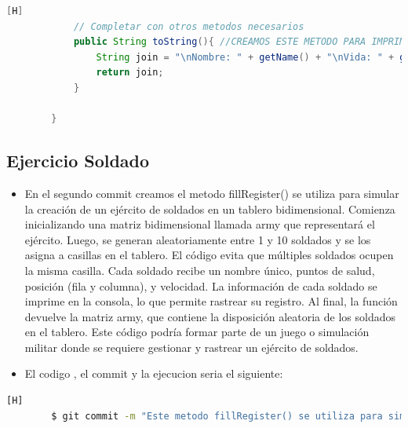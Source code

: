 \documentclass{article}
\begin{document}
\begin{lstlisting}[language=java,caption={Las lineas de codigos del metodo creado:}][H]
			// Completar con otros metodos necesarios
			public String toString(){ //CREAMOS ESTE METODO PARA IMPRIMIR LOS DATOS DEl OBJETO
				String join = "\nNombre: " + getName() + "\nVida: " + getLifeActual() + "\nFila: " + getRow() + "\nColumna: " + getColumn() + "\nNivel de ataque: " + getAttackLevel() + "\nNivel de Defensa: " + getDefenseLevel() + "\nNivel de vida: " + getLifeLevel() + "\nVelocidad: " + getSpeed() + "\nActitud: " + getAttitude() + "\nEstado: " + getLives(); //Agregamos un espaciador para poder separar
				return join;
			}
			
		}

	\end{lstlisting}
	\subsection{Ejercicio Soldado}
	\begin{itemize}	
		\item En el segundo commit creamos el metodo fillRegister() se utiliza para simular la creación de un ejército de soldados en un tablero bidimensional. Comienza inicializando una matriz bidimensional llamada army que representará el ejército. Luego, se generan aleatoriamente entre 1 y 10 soldados y se los asigna a casillas en el tablero. El código evita que múltiples soldados ocupen la misma casilla. Cada soldado recibe un nombre único, puntos de salud, posición (fila y columna), y velocidad. La información de cada soldado se imprime en la consola, lo que permite rastrear su registro. Al final, la función devuelve la matriz army, que contiene la disposición aleatoria de los soldados en el tablero. Este código podría formar parte de un juego o simulación militar donde se requiere gestionar y rastrear un ejército de soldados.
		\item El codigo , el commit y la ejecucion seria el siguiente:
	\end{itemize}	
	\begin{lstlisting}[language=bash,caption={Commit}][H]
		$ git commit -m "Este metodo fillRegister() se utiliza para simular la creacion de un ejercito de soldados en un tablero bidimensional Comienza inicializando una matriz bidimensional llamada army que representara el ejercito. Luego, se generan aleatoriamente entre 1 y 10 soldados y se los asigna a casillas en el tablero. El codigo evita que multiples soldados ocupen la misma casilla. Cada soldado recibe un nombre unico, puntos de salud, posicion (fila y columna), y velocidad. La informacion de cada soldado se imprime en la consola, lo que permite rastrear su registro. Al final, la funcion devuelve la matriz army, que contiene la disposicion aleatoria de los soldados en el tablero. Este codigo podria formar parte de un juego o simulacion militar donde se requiere gestionar y rastrear un ejercito de soldados."
	\end{lstlisting}	
\end{document}
